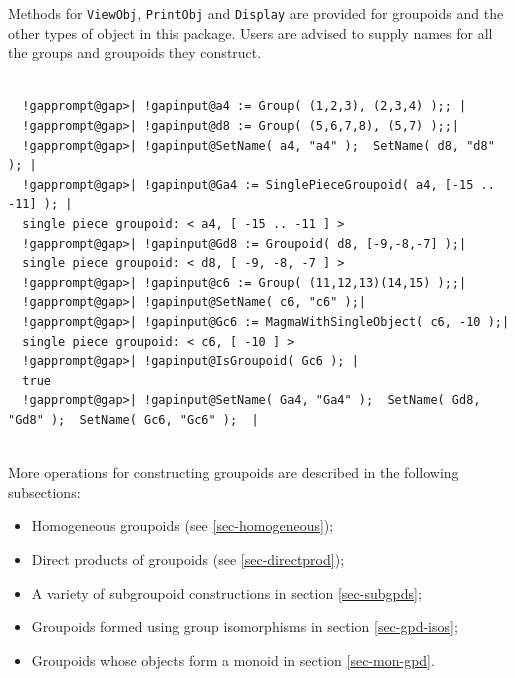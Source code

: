 \documentclass[a4paper,11pt]{report}
\begin{document}
{{{ Methods for \texttt{ViewObj}, \texttt{PrintObj} and \texttt{Display} are provided for groupoids and the other types of object in this package.
Users are advised to supply names for all the groups and groupoids they
construct. 

 }

 
\begin{Verbatim}[commandchars=!@|,fontsize=\small,frame=single,label=Example]
  
  !gapprompt@gap>| !gapinput@a4 := Group( (1,2,3), (2,3,4) );; |
  !gapprompt@gap>| !gapinput@d8 := Group( (5,6,7,8), (5,7) );;|
  !gapprompt@gap>| !gapinput@SetName( a4, "a4" );  SetName( d8, "d8" ); |
  !gapprompt@gap>| !gapinput@Ga4 := SinglePieceGroupoid( a4, [-15 .. -11] ); |
  single piece groupoid: < a4, [ -15 .. -11 ] >
  !gapprompt@gap>| !gapinput@Gd8 := Groupoid( d8, [-9,-8,-7] );|
  single piece groupoid: < d8, [ -9, -8, -7 ] >
  !gapprompt@gap>| !gapinput@c6 := Group( (11,12,13)(14,15) );;|
  !gapprompt@gap>| !gapinput@SetName( c6, "c6" );|
  !gapprompt@gap>| !gapinput@Gc6 := MagmaWithSingleObject( c6, -10 );|
  single piece groupoid: < c6, [ -10 ] >
  !gapprompt@gap>| !gapinput@IsGroupoid( Gc6 ); |
  true
  !gapprompt@gap>| !gapinput@SetName( Ga4, "Ga4" );  SetName( Gd8, "Gd8" );  SetName( Gc6, "Gc6" );  |
  
\end{Verbatim}
 More operations for constructing groupoids are described in the following
subsections: 
\begin{itemize}
\item  Homogeneous groupoids (see \ref{sec-homogeneous}); 
\item  Direct products of groupoids (see \ref{sec-directprod}); 
\item  A variety of subgroupoid constructions in section \ref{sec-subgpds}; 
\item  Groupoids formed using group isomorphisms in section \ref{sec-gpd-isos}; 
\item  Groupoids whose objects form a monoid in section \ref{sec-mon-gpd}. 
\end{itemize}
 

}}
\end{document}
